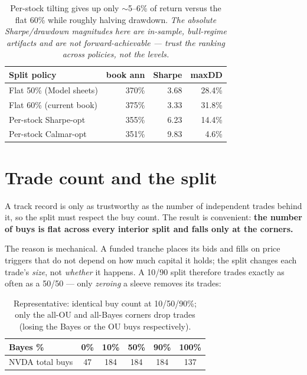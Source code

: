 \documentclass[11pt]{article}
\begin{document}
\begin{table}[h]\centering\small
\renewcommand{\arraystretch}{1.12}
\begin{tabular}{l rrr}
\toprule
\textbf{Split policy} & \textbf{book ann} & \textbf{Sharpe} & \textbf{maxDD}\\
\midrule
Flat 50\% (Model sheets) & 370\% & 3.68 & 28.4\%\\
Flat 60\% (current book) & 375\% & 3.33 & 31.8\%\\
Per-stock Sharpe-opt     & 355\% & 6.23 & 14.4\%\\
Per-stock Calmar-opt     & 351\% & 9.83 & 4.6\%\\
\bottomrule
\end{tabular}
\caption*{\footnotesize Per-stock tilting gives up only $\sim$5--6\% of return versus the flat
60\% while roughly halving drawdown. \emph{The absolute Sharpe/drawdown magnitudes here are
in-sample, bull-regime artifacts and are not forward-achievable --- trust the ranking across
policies, not the levels.}}
\end{table}

\section{Trade count and the split}

A track record is only as trustworthy as the number of independent trades behind it, so the
split must respect the buy count. The result is convenient: \textbf{the number of buys is flat
across every interior split and falls only at the corners.}

The reason is mechanical. A funded tranche places its bids and fills on price triggers that do
not depend on how much capital it holds; the split changes each trade's \emph{size}, not
\emph{whether} it happens. A 10/90 split therefore trades exactly as often as a 50/50 --- only
\emph{zeroing} a sleeve removes its trades:

\begin{table}[h]\centering\small
\renewcommand{\arraystretch}{1.1}
\begin{tabular}{l ccccc}
\toprule
\textbf{Bayes \%} & 0\% & 10\% & 50\% & 90\% & 100\%\\
\midrule
NVDA total buys & 47 & 184 & 184 & 184 & 137\\
\bottomrule
\end{tabular}
\caption*{\footnotesize Representative: identical buy count at 10/50/90\%; only the all-OU and
all-Bayes corners drop trades (losing the Bayes or the OU buys respectively).}
\end{table}
\end{document}
